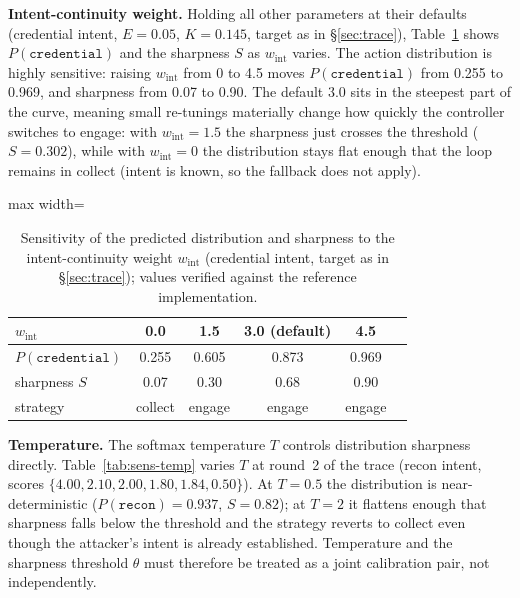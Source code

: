 \documentclass[11pt]{article}
\newcommand{\act}[1]{\texttt{#1}}
\begin{document}
\textbf{Intent-continuity weight.} Holding all other parameters at their
defaults (credential intent, $E=0.05$, $K=0.145$, target as in
\S\ref{sec:trace}), Table~\ref{tab:sens-int} shows $P(\act{credential})$
and the sharpness $S$ as $w_{\mathrm{int}}$ varies. The action
distribution is highly sensitive: raising $w_{\mathrm{int}}$ from 0 to 4.5
moves $P(\act{credential})$ from 0.255 to 0.969, and sharpness from 0.07
to 0.90. The default 3.0 sits in the steepest part of the curve, meaning
small re-tunings materially change how quickly the controller switches to
engage: with $w_{\mathrm{int}} = 1.5$ the sharpness just crosses the
threshold ($S = 0.302$), while with $w_{\mathrm{int}} = 0$ the distribution
stays flat enough that the loop remains in collect (intent is known, so
the fallback does not apply).

\begin{table}[ht]
\centering
\begin{adjustbox}{max width=\linewidth}\begin{tabular}{@{}lccccc@{}}
\toprule
$w_{\mathrm{int}}$ & 0.0 & 1.5 & 3.0 (default) & 4.5 \\
\midrule
$P(\act{credential})$ & 0.255 & 0.605 & 0.873 & 0.969 \\
sharpness $S$ & 0.07 & 0.30 & 0.68 & 0.90 \\
strategy & collect & engage & engage & engage \\
\bottomrule
\end{tabular}\end{adjustbox}
\caption{Sensitivity of the predicted distribution and sharpness to the
intent-continuity weight $w_{\mathrm{int}}$ (credential intent, target as in
\S\ref{sec:trace}); values verified against the reference implementation.}
\label{tab:sens-int}
\end{table}

\textbf{Temperature.} The softmax temperature $T$ controls distribution
sharpness directly. Table~\ref{tab:sens-temp} varies $T$ at round~2 of the
trace (recon intent, scores $\{4.00, 2.10, 2.00, 1.80, 1.84, 0.50\}$). At
$T=0.5$ the distribution is near-deterministic ($P(\act{recon})=0.937$,
$S=0.82$); at $T=2$ it flattens enough that sharpness falls below the
threshold and the strategy reverts to collect even though the attacker's
intent is already established. Temperature and the sharpness threshold
$\theta$ must therefore be treated as a joint calibration pair, not
independently.
\end{document}
